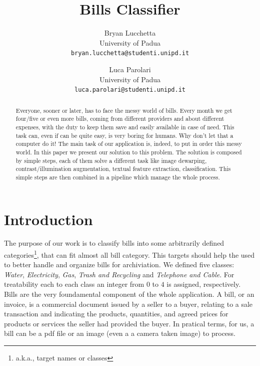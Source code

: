 \documentclass[10pt,twocolumn,letterpaper]{article}
\begin{document}
\title{Bills Classifier}

\author{Bryan Lucchetta\\
{\small University of Padua}\\
{\tt\small bryan.lucchetta@studenti.unipd.it}
\and
Luca Parolari\\
{\small University of Padua}\\
{\tt\small luca.parolari@studenti.unipd.it}
}

\maketitle


\begin{abstract}
Everyone, sooner or later, has to face the messy world of bills. Every
month we get four/five or even more bills, coming from different
providers and about different expenses, with the duty to keep them
save and easily available in case of need. This task can, even if can
be quite easy, is very boring for humans. Why don't let that a
computer do it! The main task of our application is, indeed, to put in
order this messy world.  In this paper we present our solution to this
problem. The solution is composed by simple steps, each of them solve
a different task like image dewarping, contrast/illumination
augmentation, textual feature extraction, classification. This simple
steps are then combined in a pipeline which manage the whole process.
\end{abstract}


\section{Introduction}

The purpose of our work is to classify bills into some arbitrarily
defined categories\footnote{a.k.a., target names or classes}, that can
fit almost all bill category. This targets should help the used to
better handle and organize bills for archiviation. We defined five
classes: \emph{Water}, \emph{Electricity}, \emph{Gas}, \emph{Trash and
  Recycling} and \emph{Telephone and Cable}. For treatability each to
each class an integer from $0$ to $4$ is assigned, respectively. Bills
are the very foundamental component of the whole application. A bill,
or an invoice, is a commercial document issued by a seller to a buyer,
relating to a sale transaction and indicating the products,
quantities, and agreed prices for products or services the seller had
provided the buyer. In pratical terms, for us, a bill can be a pdf
file or an image (even a a camera taken image) to process.
\end{document}
